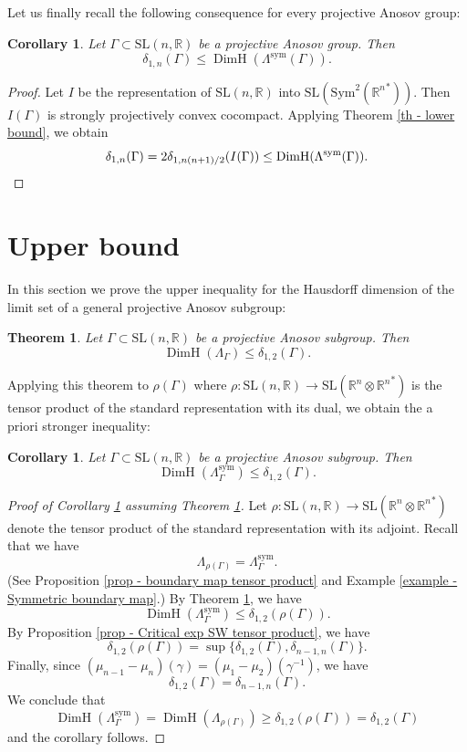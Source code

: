 \documentclass[JEP,XML,SOM,Unicode,NoEqCountersInSection,NoFloatCountersInSection,published]{cedram}
\newtheorem{theorem}[theo]{Theorem}
\newtheorem{coro}[theo]{Corollary}
\theoremstyle{definition}
\newcommand{\R}{\mathbb{R}}
\newcommand{\SL}{\mathrm{SL}}
\DeclareMathOperator{\DimH}{DimH}
\let\G\Gamma
\let\g\gamma
\begin{document}
Let us finally recall the following consequence for every projective Anosov group:
\begin{coro}
Let $\G \subset \SL(n,\R)$ be a projective Anosov group. Then
\[\delta_{1,n}(\G) \leq \DimH(\Lambda^{\mathrm{sym}}(\G)).\]
\end{coro}

\begin{proof}
Let $I$ be the representation of $\SL(n,\R)$ into $\SL(\mathrm{Sym}^2({\R^n}^*))$. Then $I(\G)$ is strongly projectively convex cocompact. Applying Theorem \ref{th - lower bound}, we obtain
\[\delta_{1,n}(\G) = 2 \delta_{1, n(n+1)/2}(I(\G)) \leq \DimH(\Lambda^{\mathrm{sym}}(\G)).\qedhere\]
\end{proof}

\section{Upper bound} \label{sec - upper bound}

In this section we prove the upper inequality for the Hausdorff dimension of the limit set of a general projective Anosov subgroup:

\begin{theorem} \label{th - upper bound}
Let $\G\subset \SL(n,\R)$ be a projective Anosov subgroup. Then
\[\DimH(\Lambda_\G) \leq \delta_{1,2}(\G).\]
\end{theorem}

Applying this theorem to $\rho(\G)$ where $\rho: \SL(n,\R) \to \SL(\R^n \otimes {\R^n}^*)$ is the tensor product of the standard representation with its dual, we obtain the a priori stronger inequality:

\begin{coro} \label{c - upper bound symmetric}
Let $\G\subset \SL(n,\R)$ be a projective Anosov subgroup. Then
\[\DimH(\Lambda^{\mathrm{sym}}_\G) \leq \delta_{1,2}(\G).\]
\end{coro}

\begin{proof}[Proof of Corollary \ref{c - upper bound symmetric} assuming Theorem \ref{th - upper bound}]
Let $\rho: \SL(n,\R) \to \SL(\R^n \otimes {\R^n}^*)$ denote the tensor product of the standard representation with its adjoint. Recall that we have
\[\Lambda_{\rho(\Gamma)}= \Lambda_\Gamma^{\mathrm{sym}}.\]
(See Proposition \ref{prop - boundary map tensor product} and Example \ref{example - Symmetric boundary map}.)
By Theorem \ref{th - upper bound}, we have
\[\DimH(\Lambda^{\mathrm{sym}}_\G) \leq \delta_{1,2}(\rho(\G)).\]
By Proposition \ref{prop - Critical exp SW tensor product}, we have
\[\delta_{1,2}(\rho(\G)) = \sup \{\delta_{1,2}(\G), \delta_{n-1,n}(\G)\}.\] Finally, since $(\mu_{n-1}-\mu_n)(\g) = (\mu_1 - \mu_2)(\g^{-1})$, we have
\[\delta_{1,2}(\G) = \delta_{n-1,n}(\G).\]
We conclude that
\[\DimH(\Lambda_\Gamma^{\mathrm{sym}}) = \DimH(\Lambda_{\rho(\Gamma)}) \geq \delta_{1,2}(\rho(\G)) = \delta_{1,2}(\G)\]
and the corollary follows.
\end{proof}
\end{document}
